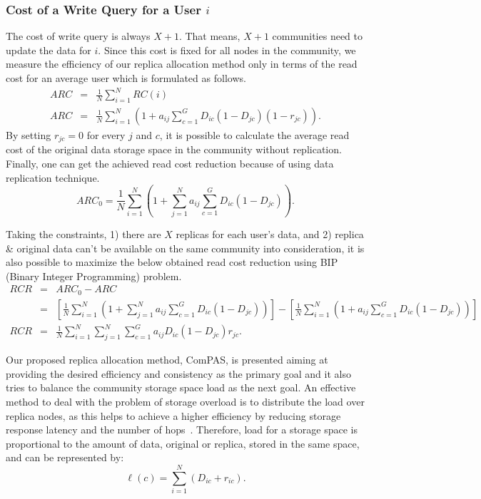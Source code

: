 \subsubsection{Cost of a Write Query for a User $i$}\label{Chap4_03_03_02}
The cost of write query is always $X+1$. That means, $X+1$ communities need to update the data for $i$. Since this cost is fixed for all nodes in the community, we measure the efficiency of our replica allocation method only in terms of the read cost for an average user which is formulated as follows.
\begin{eqnarray}
ARC&=&\frac{1}{N}\sum_{i=1}^N RC(i)\nonumber\\
ARC&=&\frac{1}{N}\sum_{i=1}^N \left(1+a_{ij}\sum_{c=1}^G D_{ic}(1-D_{jc})(1-r_{jc})\right).
\end{eqnarray}
By setting $r_{jc} = 0$ for every $j$ and $c$, it is possible to calculate the average read cost of the original data storage space in the community without replication. Finally, one can get the achieved read cost reduction because of using data replication technique.
\begin{equation}
ARC_0=\frac{1}{N}\sum_{i=1}^N \left(1+\sum_{j=1}^N a_{ij}\sum_{c=1}^G D_{ic}(1-D_{jc})\right).
\end{equation}

Taking the constraints, 1) there are $X$ replicas for each user's data, and 2) replica \& original data can't be available on the same community into consideration, it is also possible to maximize the below obtained read cost reduction using BIP (Binary Integer Programming) problem.
\begin{eqnarray}
RCR&=&ARC_0-ARC\nonumber\\
   &=&\left[\frac{1}{N}\sum_{i=1}^N \left(1+\sum_{j=1}^N a_{ij}\sum_{c=1}^G D_{ic}(1-D_{jc})\right)\right]-\left[\frac{1}{N}\sum_{i=1}^N \left(1+a_{ij}\sum_{c=1}^G D_{ic}(1-D_{jc})\right)\right]\nonumber\\
RCR&=&\frac{1}{N}\sum_{i=1}^N\sum_{j=1}^N\sum_{c=1}^G a_{ij}D_{ic}(1-D_{jc})r_{jc}.
\end{eqnarray}

Our proposed replica allocation method, ComPAS, is presented aiming at providing the desired efficiency and consistency as the primary goal and it also tries to balance the community storage space load as the next goal. An effective method to deal with the problem of storage overload is to distribute the load over replica nodes, as this helps to achieve a higher efficiency by reducing storage response latency and the number of hops~\cite{ADerhab2009}\cite{HShen2010}. Therefore, load for a storage space is proportional to the amount of data, original or replica, stored in the same space, and can be represented by:
\begin{equation}
\ell(c)=\sum_{i=1}^N (D_{ic}+r_{ic}).
\end{equation}

